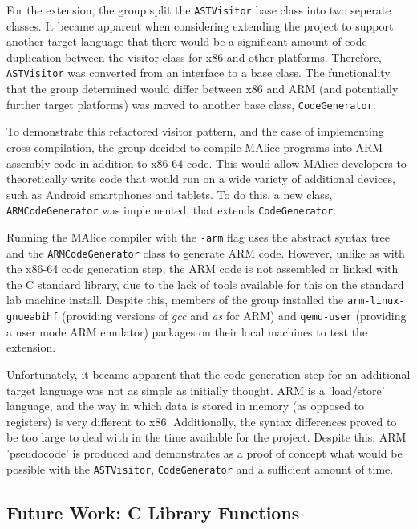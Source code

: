\documentclass[a4wide, 11pt]{article}
\begin{document}
For the extension, the group split the \texttt{ASTVisitor} base class into two
seperate classes. It became apparent when considering extending the project to
support another target language that there would be a significant amount of 
code duplication between the visitor class for x86 and other platforms. 
Therefore, \texttt{ASTVisitor} was converted from an interface to a base class. 
The functionality that the group determined would differ between x86 and ARM 
(and potentially further target platforms) was moved to another base class, 
\texttt{CodeGenerator}.

To demonstrate this refactored visitor pattern, and the ease of implementing
cross-compilation, the group decided to compile MAlice programs into ARM
assembly code in addition to x86-64 code. This would allow MAlice developers
to theoretically write code that would run on a wide variety of additional
devices, such as Android smartphones and tablets. To do this, a new class, 
\texttt{ARMCodeGenerator} was implemented, that extends \texttt{CodeGenerator}.

Running the MAlice compiler with the \texttt{-arm} flag uses the abstract syntax
tree and the \texttt{ARMCodeGenerator} class to generate ARM code. However, unlike 
as with the x86-64 code generation step, the ARM code is not assembled or linked
with the C standard library, due to the lack of tools available for this on the
standard lab machine install. Despite this, members of the group installed the 
\texttt{arm-linux-gnueabihf} (providing versions of \emph{gcc} and \emph{as} for 
ARM) and \texttt{qemu-user} (providing a user mode ARM emulator) packages on 
their local machines to test the extension.

Unfortunately, it became apparent that the code generation step for an 
additional target language was not as simple as initially thought. ARM is a 
'load/store' language, and the way in which data is stored in memory (as opposed
to registers) is very different to x86. Additionally, the syntax differences
proved to be too large to deal with in the time available for the project. 
Despite this, ARM 'pseudocode' is produced and demonstrates as a proof of 
concept what would be possible with the \texttt{ASTVisitor}, 
\texttt{CodeGenerator} and a sufficient amount of time.

\subsection{Future Work: C Library Functions}
\end{document}
